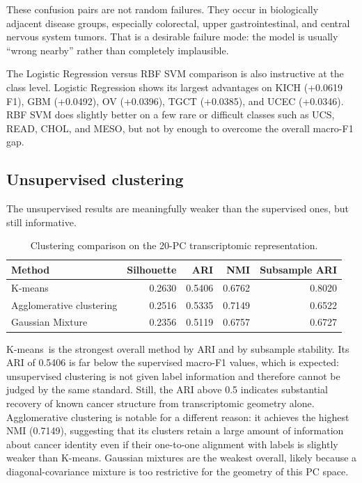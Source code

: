 \documentclass[11pt]{article}
\newcommand{\bestcluster}{K-means}
\begin{document}
These confusion pairs are not random failures. They occur in biologically adjacent disease groups, especially colorectal, upper gastrointestinal, and central nervous system tumors. That is a desirable failure mode: the model is usually ``wrong nearby'' rather than completely implausible.

The Logistic Regression versus RBF SVM comparison is also instructive at the class level. Logistic Regression shows its largest advantages on KICH (+0.0619 F1), GBM (+0.0492), OV (+0.0396), TGCT (+0.0385), and UCEC (+0.0346). RBF SVM does slightly better on a few rare or difficult classes such as UCS, READ, CHOL, and MESO, but not by enough to overcome the overall macro-F1 gap.

\subsection{Unsupervised clustering}
The unsupervised results are meaningfully weaker than the supervised ones, but still informative.

\begin{table}[H]
\centering
\caption{Clustering comparison on the 20-PC transcriptomic representation.}
\begin{tabular}{lrrrr}
\toprule
\textbf{Method} & \textbf{Silhouette} & \textbf{ARI} & \textbf{NMI} & \textbf{Subsample ARI} \\
\midrule
K-means & 0.2630 & 0.5406 & 0.6762 & 0.8020 \\
Agglomerative clustering & 0.2516 & 0.5335 & 0.7149 & 0.6522 \\
Gaussian Mixture & 0.2356 & 0.5119 & 0.6757 & 0.6727 \\
\bottomrule
\end{tabular}
\label{tab:clustering}
\end{table}

\bestcluster\ is the strongest overall method by ARI and by subsample stability. Its ARI of 0.5406 is far below the supervised macro-F1 values, which is expected: unsupervised clustering is not given label information and therefore cannot be judged by the same standard. Still, the ARI above 0.5 indicates substantial recovery of known cancer structure from transcriptomic geometry alone. Agglomerative clustering is notable for a different reason: it achieves the highest NMI (0.7149), suggesting that its clusters retain a large amount of information about cancer identity even if their one-to-one alignment with labels is slightly weaker than K-means. Gaussian mixtures are the weakest overall, likely because a diagonal-covariance mixture is too restrictive for the geometry of this PC space.
\end{document}
